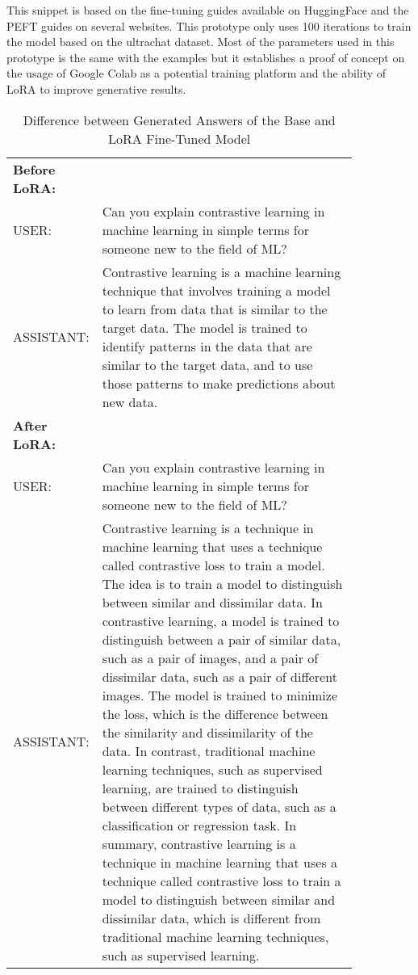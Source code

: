 This snippet is based on the fine-tuning guides available on HuggingFace and the PEFT guides on several websites.
This prototype only uses 100 iterations to train the model based on the ultrachat dataset.
Most of the parameters used in this prototype is the same with the examples but it establishes a proof of concept on the usage of Google Colab as a potential training platform and the ability of LoRA to improve generative results.

\begin{table}[h!]
	\caption{Difference between Generated Answers of the Base and LoRA Fine-Tuned Model} \vspace{0.25em}
	\centering
	\renewcommand{\arraystretch}{1.2} %
	\begin{tabular}{@{}lp{0.85\linewidth}@{}}
		\hline
		\textbf{Before LoRA:} & \\
		USER: & Can you explain contrastive learning in machine learning in simple terms for someone new to the field of ML? \\
		ASSISTANT: & Contrastive learning is a machine learning technique that involves training a model to learn from data that is similar to the target data. The model is trained to identify patterns in the data that are similar to the target data, and to use those patterns to make predictions about new data. \\
		\hline
		\textbf{After LoRA:} & \\
		USER: & Can you explain contrastive learning in machine learning in simple terms for someone new to the field of ML? \\
		ASSISTANT: & Contrastive learning is a technique in machine learning that uses a technique called contrastive loss to train a model. The idea is to train a model to distinguish between similar and dissimilar data. In contrastive learning, a model is trained to distinguish between a pair of similar data, such as a pair of images, and a pair of dissimilar data, such as a pair of different images. The model is trained to minimize the loss, which is the difference between the similarity and dissimilarity of the data. In contrast, traditional machine learning techniques, such as supervised learning, are trained to distinguish between different types of data, such as a classification or regression task. In summary, contrastive learning is a technique in machine learning that uses a technique called contrastive loss to train a model to distinguish between similar and dissimilar data, which is different from traditional machine learning techniques, such as supervised learning. \\
		\hline
	\end{tabular}
\end{table}
